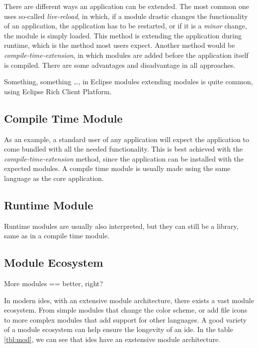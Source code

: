 There are different ways an application can be extended. The most common one
uses so-called \textit{live-reload}, in which, if a module drastic changes the
functionality of an application, the application has to be restarted, or if it
is a \textit{minor} change, the module is simply loaded. This method is
extending the application during runtime, which is the method most users
expect. Another method would be \textit{compile-time-extension}, in which
modules are added before the application itself is compiled. There are some
advantages and disadvantage in all approaches.

Something, something \dots, in Eclipse modules extending modules is quite
common, using Eclipse Rich Client Platform. \cite{eclipseRcp}

\subsection{Compile Time Module}

As an example, a standard user of any application will expect the application to
come bundled with all the needed functionality. This is best achieved with the
\textit{compile-time-extension} method, since the application can be installed
with the expected modules. A compile time module is usually made using the same
language as the core application.

\subsection{Runtime Module}


Runtime modules are usually also interpreted, but they can still be a
library, same as in a compile time module.

\subsection{Module Ecosystem}

More modules == better, right?

In modern \gls{ide}s, with an extensive module architecture, there exists a
vast module ecosystem. From simple modules that change the color scheme, or
add file icons to more complex modules that add support for other languages.
A good variety of a module ecosystem can help ensure the longevity of an
\gls{ide}. In the table \ref{tbl:mod}, we can see that \gls{ide}s have an
exstensive module architecture. \footnotemark

